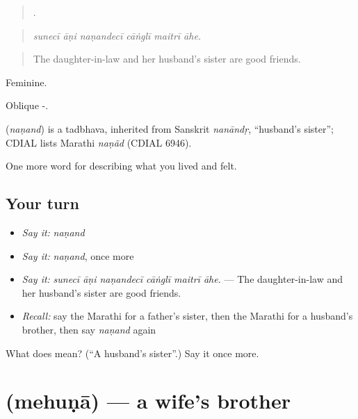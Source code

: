 \begin{quote}
     .
\end{quote}

\begin{quote}
\emph{sunecī āṇi naṇandecī cāṅglī maitrī āhe.}
\end{quote}

\begin{quote}
The daughter-in-law and her husband's sister are good friends.
\end{quote}

Feminine.

Oblique -.

\begin{cousinweb}
\textbf{} (\emph{naṇand}) is a tadbhava, inherited from Sanskrit \emph{nanāndṛ}, \textquotedblleft{}husband's sister\textquotedblright{}; CDIAL lists Marathi \emph{naṇãd} (CDIAL 6946).
\end{cousinweb}

\begin{grammarlens}[title={What you've built}]
One more word for describing what you lived and felt.
\end{grammarlens}

\subsection*{Your turn}
\begin{itemize}
\raggedright
  \item \emph{Say it:} \emph{naṇand}
  \item \emph{Say it:} \emph{naṇand}, once more
  \item \emph{Say it:} \emph{sunecī āṇi naṇandecī cāṅglī maitrī āhe.} — The daughter-in-law and her husband's sister are good friends.
  \item \emph{Recall:} say the Marathi for a father's sister, then the Marathi for a husband's brother, then say \emph{naṇand} again
\end{itemize}

\begin{tcolorbox}[breakable,colback=teal!4,colframe=teal!35!black,title={Before you move on}]
What does  mean? (\textquotedblleft{}A husband's sister\textquotedblright{}.) Say it once more.
\end{tcolorbox}
\section[\texorpdfstring{\mr{मेहुणा} (mehuṇā)}{मेहुणा (mehuṇā)}]{ (mehuṇā) — a wife's brother}

